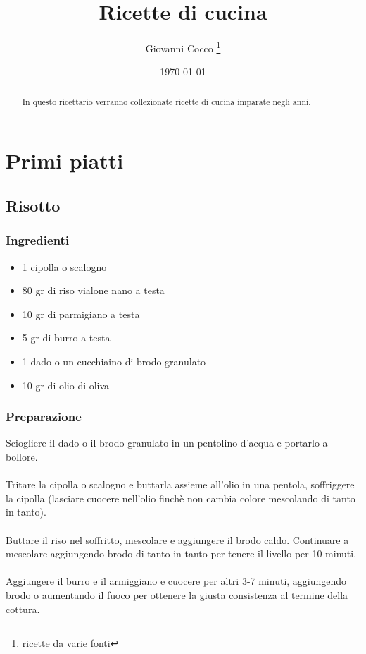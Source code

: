 \documentclass[12pt, a4paper]{article}
\title{Ricette di cucina}
\author{Giovanni Cocco \thanks{ricette da varie fonti}}
\date{\monthyeardate\today}
\begin{document}
\begin{titlepage}
\maketitle
\thispagestyle{empty}
\end{titlepage}

\begin{abstract}
In questo ricettario verranno collezionate ricette di cucina imparate negli anni.
\end{abstract}
\clearpage

\tableofcontents{}
\clearpage

\section{Primi piatti}

\subsection{Risotto}

\subsubsection{Ingredienti}
\begin{itemize}
\item 1 cipolla o scalogno
\item 80 gr di riso vialone nano a testa
\item 10 gr di parmigiano a testa
\item 5 gr di burro a testa
\item 1 dado o un cucchiaino di brodo granulato
\item 10 gr di olio di oliva
\end{itemize}

\subsubsection{Preparazione}
	Sciogliere il dado o il brodo granulato in un pentolino d'acqua e
	portarlo a bollore.\\\\
	Tritare la cipolla o scalogno e buttarla assieme all'olio in una 
	pentola, soffriggere la cipolla (lasciare cuocere nell'olio finchè 
	non cambia colore mescolando di tanto in tanto).\\\\
	Buttare il riso nel soffritto, mescolare e aggiungere il brodo caldo.
	Continuare a mescolare aggiungendo brodo di tanto in tanto per 
	tenere il livello per 10 minuti.\\\\
	Aggiungere il burro e il armiggiano e cuocere per altri 3-7 minuti,
	aggiungendo brodo o aumentando il fuoco per ottenere la giusta 
	consistenza al termine della cottura.
\end{document}
